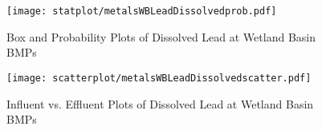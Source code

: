         \begin{figure}[hb]   %
            \centering
            \texttt{[image: statplot/metalsWBLeadDissolvedprob.pdf]}
            \caption{Box and Probability Plots of Dissolved Lead at Wetland Basin BMPs}
        \end{figure}         %
        
        
        \begin{figure}[hb]   %
            \centering
            \texttt{[image: scatterplot/metalsWBLeadDissolvedscatter.pdf]}
            \caption{Influent vs. Effluent Plots of Dissolved Lead at Wetland Basin BMPs}
        \end{figure}         %
        \clearpage
        